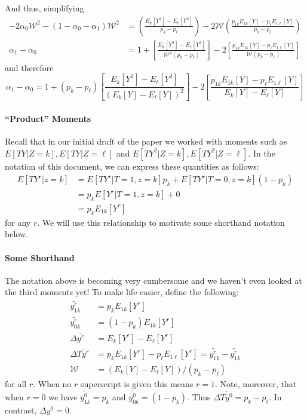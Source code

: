 \documentclass[12pt]{article}
\begin{document}
\normalsize
And thus, simplifying
\begin{align*}
  -2\alpha_0 \mathcal{W}^2 - (1 - \alpha_0 - \alpha_1) \mathcal{W}^2 &= \left(\frac{E_k[Y^2] - E_{\ell}[Y^2]}{p_k - p_\ell} \right)- 2\mathcal{W} \left( \frac{p_{1k}E_{1k}[Y] - p_\ell E_{1\ell}[Y]}{p_k - p_\ell} \right)  \\
  \alpha_1  - \alpha_0   &= 1 +  \left[\frac{E_k[Y^2] - E_{\ell}[Y^2]}{\mathcal{W}^2(p_k - p_\ell)} \right]-2  \left[\frac{p_{1k}E_{1k}[Y] - p_\ell E_{1\ell}[Y]}{\mathcal{W}(p_k - p_\ell)} \right] 
\end{align*}
and therefore
\begin{equation}
  \alpha_1  - \alpha_0  = 1 +  (p_k - p_\ell)\left[\frac{E_k[Y^2] - E_{\ell}[Y^2]}{\left( E_k[Y] - E_\ell[Y] \right)^2} \right]-2  \left[\frac{p_{1k}E_{1k}[Y] - p_\ell E_{1\ell}[Y]}{E_k[Y] - E_\ell[Y]} \right] 
\end{equation}

\paragraph{``Product'' Moments}
Recall that in our initial draft of the paper we worked with moments such as $E[TY|Z=k], E[TY|Z=\ell]$ and $E[TY^2|Z=k], E[TY^2|Z=\ell]$.
In the notation of this document, we can express these quantities as follows:
\begin{align*}
  E[TY^r|z=k] &= E[TY^r|T=1,z=k]p_k + E[TY^r|T=0,z=k](1 - p_k)\\
  &= p_k E[Y^r|T=1,z=k] + 0\\
  &= p_k E_{1k}[Y^r]
\end{align*}
for any $r$. 
We will use this relationship to motivate some shorthand notation below.

\paragraph{Some Shorthand}
The notation above is becoming very cumbersome and we haven't even looked at the third moments yet! 
To make life easier, define the following: 
\begin{align*}
  \widetilde{y^r_{1k}} &= p_k E_{1k}[Y^r] \\
  \widetilde{y^r_{0k}} &= (1 - p_k) E_{1k}[Y^r] \\
  \Delta \overline{y^r} &= E_k[Y^r] - E_\ell[Y^r]\\
  \Delta \overline{Ty^r} &= p_k E_{1k}[Y^r] - p_\ell E_{1\ell}[Y^r] = \widetilde{y^r_{1k}} - \widetilde{y^r_{1k}}\\
  \mathcal{W} &= (E_k[Y] - E_\ell[Y]) / (p_k - p_\ell)
\end{align*}
for all $r$.
When no $r$ superscript is given this means $r=1$.
Note, moreover, that when $r =0$ we have $\widetilde{y_{1k}^0} = p_k$ and $\widetilde{y_{0k}^0} = (1 - p_k)$.
Thus $\Delta \overline{Ty^0} = p_k - p_\ell$.
In contrast, $\Delta y^0 = 0$.
\end{document}
